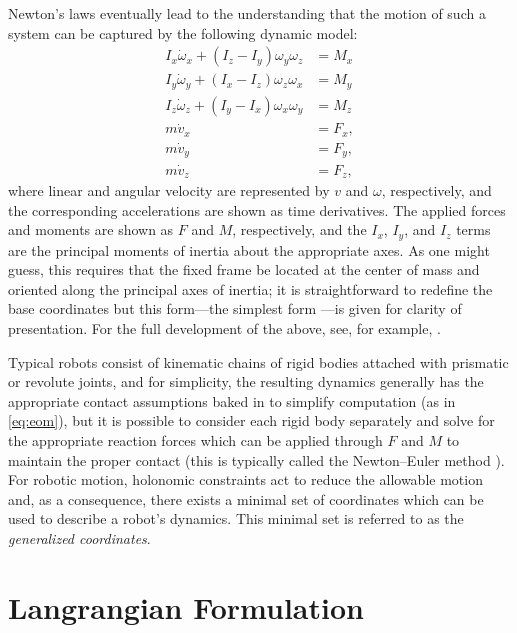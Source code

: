 Newton's laws eventually lead to the understanding that the motion of such a
system can be captured by the following dynamic model:
\begin{align*}
  I_{x} \dot{\omega}_{x} + (I_{z} - I_{y}) \omega_{y} \omega_{z} &= M_{x}\\
  I_{y} \dot{\omega}_{y} + (I_{x} - I_{z}) \omega_{z} \omega_{x} &= M_{y}\\
  I_{z} \dot{\omega}_{z} + (I_{y} - I_{x}) \omega_{x} \omega_{y} &= M_{z}\\
  m \dot{v}_{x} &= F_{x},\\
  m \dot{v}_{y} &= F_{y},\\
  m \dot{v}_{z} &= F_{z},
\end{align*}
where linear and angular velocity are represented by $v$ and $\omega$,
respectively, and the corresponding accelerations are shown as time
derivatives.
%
The applied forces and moments are shown as $F$ and $M$, respectively, and the
$I_{x}$, $I_{y}$, and $I_{z}$ terms are the principal moments of inertia about
the appropriate axes.
%
As one might guess, this requires that the fixed frame be located at the center
of mass and oriented along the principal axes of inertia; it is straightforward
to redefine the base coordinates but this form---the simplest form ---is given
for clarity of presentation.
%
For the full development of the above, see, for example, \cite[Ch. 8]{Baruh1998}.


Typical robots consist of kinematic chains of rigid bodies attached with
prismatic or revolute joints, and for simplicity, the resulting dynamics
generally has the appropriate contact assumptions baked in to simplify
computation (as in \eqref{eq:eom}), but it is possible to consider
each rigid body separately and solve for the appropriate reaction forces which
can be applied through $F$ and $M$ to maintain the proper contact (this is
typically called the Newton--Euler method \cite{Hollerbach1980}).
%
For robotic motion, holonomic constraints act to reduce the allowable motion
and, as a consequence, there exists a minimal set of coordinates which can be
used to describe a robot's dynamics.
%
This minimal set is referred to as the {\em generalized coordinates}.


\section{Langrangian Formulation}


